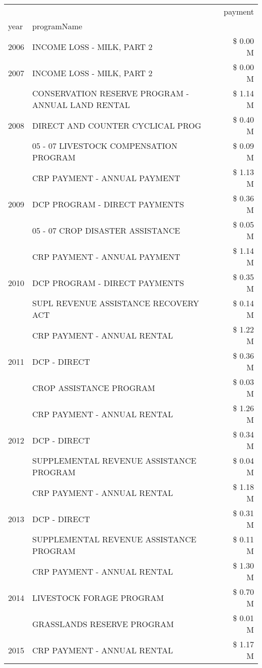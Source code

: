 \begin{tabular}{llr}
\toprule
 &  & payment \\
year & programName &  \\
\midrule
2006 & INCOME LOSS - MILK, PART 2 & \$ 0.00 M \\
\cline{1-3}
2007 & INCOME LOSS - MILK, PART 2 & \$ 0.00 M \\
\cline{1-3}
\multirow[t]{3}{*}{2008} & CONSERVATION RESERVE PROGRAM - ANNUAL LAND RENTAL & \$ 1.14 M \\
 & DIRECT AND COUNTER CYCLICAL PROG & \$ 0.40 M \\
 & 05 - 07 LIVESTOCK COMPENSATION PROGRAM & \$ 0.09 M \\
\cline{1-3}
\multirow[t]{3}{*}{2009} & CRP PAYMENT - ANNUAL PAYMENT & \$ 1.13 M \\
 & DCP PROGRAM - DIRECT PAYMENTS & \$ 0.36 M \\
 & 05 - 07 CROP DISASTER ASSISTANCE & \$ 0.05 M \\
\cline{1-3}
\multirow[t]{3}{*}{2010} & CRP PAYMENT - ANNUAL PAYMENT & \$ 1.14 M \\
 & DCP PROGRAM - DIRECT PAYMENTS & \$ 0.35 M \\
 & SUPL REVENUE ASSISTANCE RECOVERY ACT & \$ 0.14 M \\
\cline{1-3}
\multirow[t]{3}{*}{2011} & CRP PAYMENT - ANNUAL RENTAL & \$ 1.22 M \\
 & DCP - DIRECT & \$ 0.36 M \\
 & CROP ASSISTANCE PROGRAM & \$ 0.03 M \\
\cline{1-3}
\multirow[t]{3}{*}{2012} & CRP PAYMENT - ANNUAL RENTAL & \$ 1.26 M \\
 & DCP - DIRECT & \$ 0.34 M \\
 & SUPPLEMENTAL REVENUE ASSISTANCE PROGRAM & \$ 0.04 M \\
\cline{1-3}
\multirow[t]{3}{*}{2013} & CRP PAYMENT - ANNUAL RENTAL & \$ 1.18 M \\
 & DCP - DIRECT & \$ 0.31 M \\
 & SUPPLEMENTAL REVENUE ASSISTANCE PROGRAM & \$ 0.11 M \\
\cline{1-3}
\multirow[t]{3}{*}{2014} & CRP PAYMENT - ANNUAL RENTAL & \$ 1.30 M \\
 & LIVESTOCK FORAGE PROGRAM & \$ 0.70 M \\
 & GRASSLANDS RESERVE PROGRAM & \$ 0.01 M \\
\cline{1-3}
\multirow[t]{3}{*}{2015} & CRP PAYMENT - ANNUAL RENTAL & \$ 1.17 M \\

\end{tabular}
